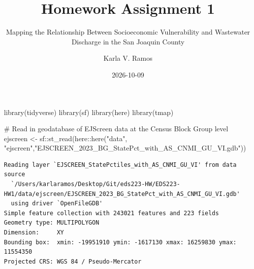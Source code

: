 \documentclass[
  letterpaper,
  DIV=11,
  numbers=noendperiod]{scrartcl}
\title{Homework Assignment 1}
\subtitle{Mapping the Relationship Between Socioeconomic Vulnerability
and Wastewater Discharge in the San Joaquin County}
\author{Karla V. Ramos}
\date{2026-10-09}
\newenvironment{Shaded}{\begin{snugshade}}{\end{snugshade}}
\newcommand{\AttributeTok}[1]{\textcolor[rgb]{0.40,0.45,0.13}{#1}}
\newcommand{\CommentTok}[1]{\textcolor[rgb]{0.37,0.37,0.37}{#1}}
\newcommand{\FunctionTok}[1]{\textcolor[rgb]{0.28,0.35,0.67}{#1}}
\newcommand{\NormalTok}[1]{\textcolor[rgb]{0.00,0.23,0.31}{#1}}
\newcommand{\OtherTok}[1]{\textcolor[rgb]{0.00,0.23,0.31}{#1}}
\newcommand{\SpecialCharTok}[1]{\textcolor[rgb]{0.37,0.37,0.37}{#1}}
\newcommand{\StringTok}[1]{\textcolor[rgb]{0.13,0.47,0.30}{#1}}
\begin{document}
\maketitle


\begin{Shaded}
\begin{Highlighting}[]
\FunctionTok{library}\NormalTok{(tidyverse)}
\FunctionTok{library}\NormalTok{(sf)}
\FunctionTok{library}\NormalTok{(here)}
\FunctionTok{library}\NormalTok{(tmap)}

\CommentTok{\# Read in geodatabase of EJScreen data at the Census Block Group level}
\NormalTok{ejscreen }\OtherTok{\textless{}{-}}\NormalTok{ sf}\SpecialCharTok{::}\FunctionTok{st\_read}\NormalTok{(here}\SpecialCharTok{::}\FunctionTok{here}\NormalTok{(}\StringTok{"data"}\NormalTok{, }\StringTok{"ejscreen"}\NormalTok{,}\StringTok{"EJSCREEN\_2023\_BG\_StatePct\_with\_AS\_CNMI\_GU\_VI.gdb"}\NormalTok{)) }
\end{Highlighting}
\end{Shaded}

\begin{verbatim}
Reading layer `EJSCREEN_StatePctiles_with_AS_CNMI_GU_VI' from data source 
  `/Users/karlaramos/Desktop/Git/eds223-HW/EDS223-HW1/data/ejscreen/EJSCREEN_2023_BG_StatePct_with_AS_CNMI_GU_VI.gdb' 
  using driver `OpenFileGDB'
Simple feature collection with 243021 features and 223 fields
Geometry type: MULTIPOLYGON
Dimension:     XY
Bounding box:  xmin: -19951910 ymin: -1617130 xmax: 16259830 ymax: 11554350
Projected CRS: WGS 84 / Pseudo-Mercator
\end{verbatim}

\begin{Shaded}
\end{Shaded}
\end{document}
